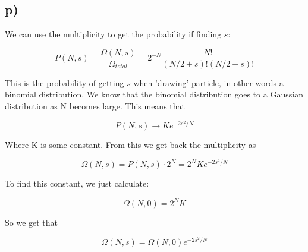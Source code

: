 \documentclass[a4paper,norsk, 10pt]{article}
\begin{document}
\subsection{p)}
We can use the multiplicity to get the probability if finding $s$:

\begin{equation}
P(N,s) = \frac{\Omega(N,s)}{\Omega_{total}} = 2^{-N}\frac{N!}{(N/2 + s)!(N/2-s)!} 
\end{equation}

This is the probability of getting $s$ when 'drawing' particle, in other words a binomial distribution. We know that the binomial distribution goes to a Gaussian  distribution as N becomes large. This means that

\begin{equation}
P(N,s) \rightarrow Ke^{-2s^2/N}
\end{equation}

Where K is some constant. From this we get back the multiplicity as

\begin{equation}
\Omega(N,s) = P(N,s)\cdot 2^N = 2^N Ke^{-2s^2/N}
\end{equation}

To find this constant, we just calculate:

\begin{equation}
\Omega(N,0) = 2^N K
\end{equation}

So we get that 

\begin{equation}
\Omega(N,s) = \Omega(N,0)e^{-2s^2/N}
\end{equation}
\end{document}
